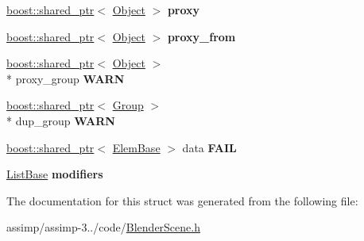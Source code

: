\begin{DoxyCompactItemize}
\item 
\hypertarget{struct_assimp_1_1_blender_1_1_object_aa0f7dacf82773f21c078312a31118404}{\hyperlink{classboost_1_1shared__ptr}{boost\+::shared\+\_\+ptr}$<$ \hyperlink{struct_assimp_1_1_blender_1_1_object}{Object} $>$ {\bfseries proxy}}\label{struct_assimp_1_1_blender_1_1_object_aa0f7dacf82773f21c078312a31118404}

\item 
\hypertarget{struct_assimp_1_1_blender_1_1_object_a238dca74476b9114f45f3345572e9f6d}{\hyperlink{classboost_1_1shared__ptr}{boost\+::shared\+\_\+ptr}$<$ \hyperlink{struct_assimp_1_1_blender_1_1_object}{Object} $>$ {\bfseries proxy\+\_\+from}}\label{struct_assimp_1_1_blender_1_1_object_a238dca74476b9114f45f3345572e9f6d}

\item 
\hypertarget{struct_assimp_1_1_blender_1_1_object_ab094d41f2fac0d0d66a80aeac04d0571}{\hyperlink{classboost_1_1shared__ptr}{boost\+::shared\+\_\+ptr}$<$ \hyperlink{struct_assimp_1_1_blender_1_1_object}{Object} $>$\\*
 proxy\+\_\+group {\bfseries W\+A\+R\+N}}\label{struct_assimp_1_1_blender_1_1_object_ab094d41f2fac0d0d66a80aeac04d0571}

\item 
\hypertarget{struct_assimp_1_1_blender_1_1_object_a0a737ecdab98c70a211118b7252091c7}{\hyperlink{classboost_1_1shared__ptr}{boost\+::shared\+\_\+ptr}$<$ \hyperlink{struct_assimp_1_1_blender_1_1_group}{Group} $>$\\*
 dup\+\_\+group {\bfseries W\+A\+R\+N}}\label{struct_assimp_1_1_blender_1_1_object_a0a737ecdab98c70a211118b7252091c7}

\item 
\hypertarget{struct_assimp_1_1_blender_1_1_object_a900a595c3c5dd3fb7bc3678aaf094811}{\hyperlink{classboost_1_1shared__ptr}{boost\+::shared\+\_\+ptr}$<$ \hyperlink{struct_assimp_1_1_blender_1_1_elem_base}{Elem\+Base} $>$ data {\bfseries F\+A\+I\+L}}\label{struct_assimp_1_1_blender_1_1_object_a900a595c3c5dd3fb7bc3678aaf094811}

\item 
\hypertarget{struct_assimp_1_1_blender_1_1_object_ada6bb1746cb7ebaae19546dd21df2bd9}{\hyperlink{struct_assimp_1_1_blender_1_1_list_base}{List\+Base} {\bfseries modifiers}}\label{struct_assimp_1_1_blender_1_1_object_ada6bb1746cb7ebaae19546dd21df2bd9}

\end{DoxyCompactItemize}


The documentation for this struct was generated from the following file\+:\begin{DoxyCompactItemize}
\item 
assimp/assimp-\/3../code/\hyperlink{_blender_scene_8h}{Blender\+Scene.\+h}\end{DoxyCompactItemize}
